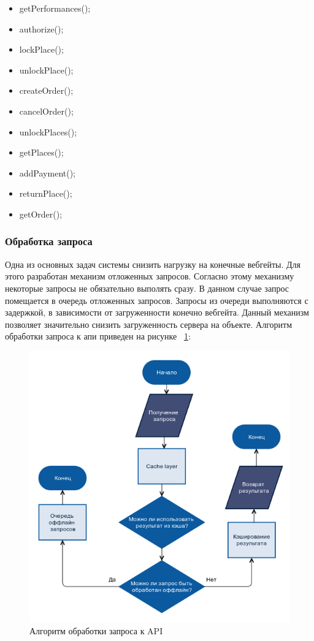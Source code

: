 \begin{itemize}
    \item getPerformances();
	\item authorize();
	\item lockPlace();
	\item unlockPlace();
	\item createOrder();
	\item cancelOrder();
	\item unlockPlaces();
	\item getPlaces();
	\item addPayment();
	\item returnPlace();
	\item getOrder();
\end{itemize}


\subsubsection{Обработка запроса}

Одна из основных задач системы снизить нагрузку на конечные вебгейты. Для этого разработан механизм отложенных запросов. Согласно этому механизму некоторые запросы не обязательно выполять сразу. В данном случае запрос помещается в очередь отложенных запросов. Запросы из очереди выполняются с задержкой, в зависимости от загруженности конечно вебгейта. Данный механизм позволяет значительно снизить загруженность сервера на объекте. Алгоритм обработки запроса к апи приведен на рисунке ~\ref{fig:request-timeline}:

\begin{figure}[H]
  	\centering
 	\includegraphics[width=1\textwidth]{images/request-timeline.png}
  	\caption{Алгоритм обработки запроса к API}
    \label{fig:request-timeline}
\end{figure}

